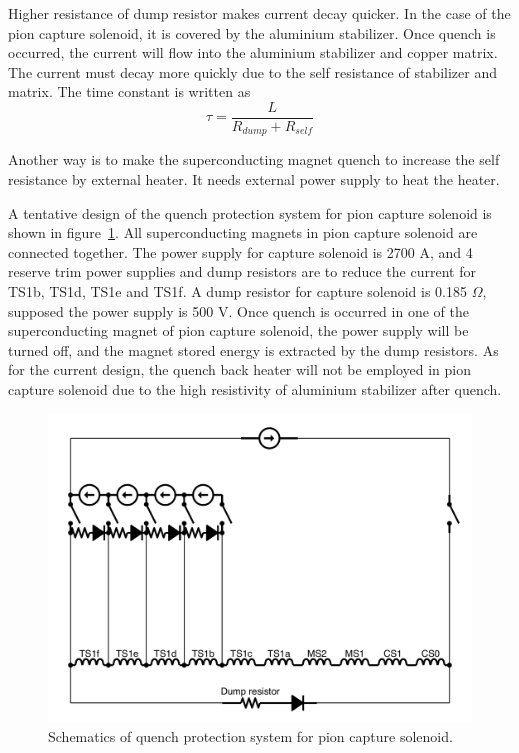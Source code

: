 Higher resistance of dump resistor makes current decay quicker.
In the case of the pion capture solenoid, it is covered by the aluminium stabilizer.
Once quench is occurred, the current will flow into the aluminium stabilizer and copper matrix.
The current must decay more quickly due to the self resistance of stabilizer and matrix.
The time constant is written as
\begin{equation}
 \tau = \frac{L}{R_{dump} + R_{self}}
\end{equation}

Another way is to make the superconducting magnet quench to increase the self resistance by external heater.
It needs external power supply to heat the heater.

A tentative design of the quench protection system for pion capture solenoid is shown in figure~\ref{capture}.
All superconducting magnets in pion capture solenoid are connected together.
The power supply for capture solenoid is 2700 A, and 4 reserve trim power supplies and dump resistors are to reduce the current for TS1b, TS1d, TS1e and TS1f.
A dump resistor for capture solenoid is 0.185 $\Omega$, supposed the power supply is 500 V.
Once quench is occurred in one of the superconducting magnet of pion capture solenoid, the power supply will be turned off, and the magnet stored energy is extracted by the dump resistors.
As for the current design, the quench back heater will not be employed in pion capture solenoid due to the high resistivity of aluminium stabilizer after quench.
\begin{figure}[H]
 \centering
 \includegraphics[scale=0.38]{chapter2/fig/capture.pdf}
 \caption{Schematics of quench protection system for pion capture solenoid.}
 \label{capture}
\end{figure}

